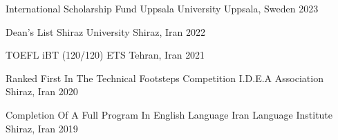 {\begin{cvhonors}
  \cvhonor
    {International Scholarship Fund} %
    {Uppsala University} %
    {Uppsala, Sweden} %
    {2023} %
    
  \cvhonor
    {Dean’s List} %
    {Shiraz University} %
    {Shiraz, Iran} %
    {2022} %
    

  \cvhonor
    {TOEFL iBT (120/120)} %
    {ETS} %
    {Tehran, Iran} %
    {2021} %

  \cvhonor
    {Ranked First In The Technical Footsteps Competition} %
    {I.D.E.A Association} %
    {Shiraz, Iran} %
    {2020} %

  \cvhonor
    {Completion Of A Full Program In English Language} %
    {Iran Language Institute} %
    {Shiraz, Iran} %
    {2019} %

\end{cvhonors}
}


